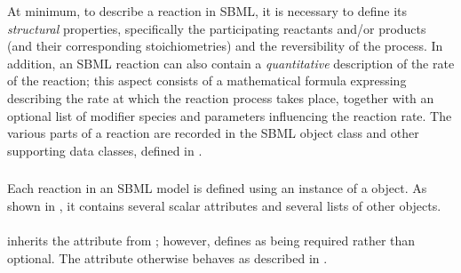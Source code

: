 At minimum, to describe a reaction in SBML, it is necessary to
define its \emph{structural} properties, specifically the
participating reactants and/or products (and their corresponding
stoichiometries) and the reversibility of the process.  In
addition, an SBML reaction can also contain a \emph{quantitative}
description of the rate of the reaction; this aspect consists of a
mathematical formula expressing describing the rate at which the
reaction process takes place, together with an optional list of
modifier species and parameters influencing the reaction rate.
The various parts of a reaction are recorded in the SBML \Reaction
object class and other supporting data classes, defined in
.


\subsubsection{}
\label{sec:reaction-type}
\label{sec:listofreactants}
\label{sec:listofproducts}
\label{sec:listofmodifiers}

Each reaction in an SBML model is defined using an instance of a
\Reaction object.  As shown in , it
contains several scalar attributes and several lists of other
objects.


\paragraph{}

{\Reaction inherits the  attribute from \SBase; however, \Reaction defines  as being required rather than optional.  The attribute otherwise behaves as described in .}

